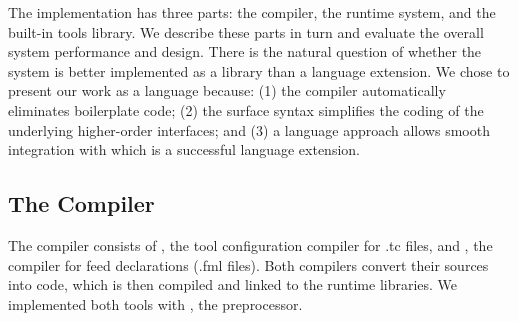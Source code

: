 The \padsd{} implementation has three parts: the compiler, the runtime
system, and the built-in tools library. We describe these
parts in turn and evaluate the overall system performance and design.
There is the natural question of whether the system is better
implemented as a library than a language extension. We chose
to present our work as a language because: (1) the compiler automatically
eliminates boilerplate code; (2) the surface syntax simplifies the coding of
the underlying higher-order interfaces; and (3) a language approach allows
smooth integration with \padsml which is a successful language extension.


\subsection{The Compiler}
The \padsd{} compiler consists of
, the tool configuration compiler for .tc files, 
and 
, the compiler for feed declarations (.fml files). 
Both compilers convert their sources into \ocaml{} code, which is then
compiled
and linked to the runtime libraries.  We implemented both tools with
\camlp{}, the \ocaml{} preprocessor. 


